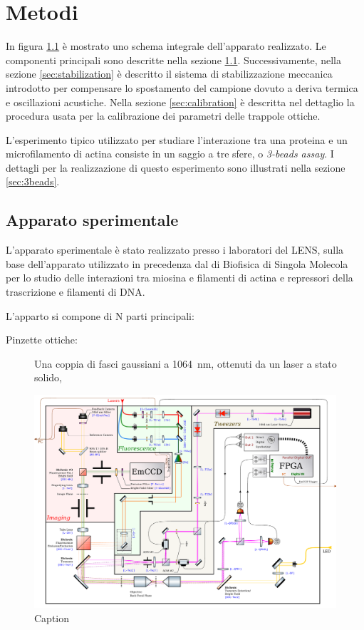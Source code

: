 \chapter{Metodi}

In figura \ref{fig:setup} è mostrato uno schema integrale
dell'apparato realizzato.
Le componenti principali sono descritte nella sezione \ref{sec:setup}.
Successivamente, nella sezione \ref{sec:stabilization} è descritto il
sistema di stabilizzazione meccanica introdotto per compensare lo
spostamento
del campione dovuto a deriva termica e oscillazioni acustiche.
Nella sezione \ref{sec:calibration} è descritta nel dettaglio la
procedura usata per la calibrazione dei parametri delle trappole
ottiche.

L'esperimento tipico utilizzato per studiare l'interazione tra una
proteina e un microfilamento di actina consiste in un saggio a tre
sfere, o \textit{3-beads assay}. I dettagli per la realizzazione di
questo esperimento sono illustrati nella sezione \ref{sec:3beads}.

\section{Apparato sperimentale}
\label{sec:setup}

L'apparato sperimentale è stato realizzato presso i laboratori del
LENS, sulla base dell'apparato utilizzato in precedenza dal di
Biofisica di Singola Molecola per lo studio delle interazioni tra
miosina e filamenti di actina e repressori della trascrizione
e filamenti di DNA.

L'apparto si compone di N parti principali:
\begin{description}
    \item[Pinzette ottiche:] Una coppia di fasci gaussiani a \SI{1064}{\nm}, ottenuti da un laser a stato solido, 
\end{description}



\begin{figure}
    \includegraphics[width=1.0\linewidth]{images/Setup.pdf}
    \caption{Caption}
    \label{fig:setup}
\end{figure}

